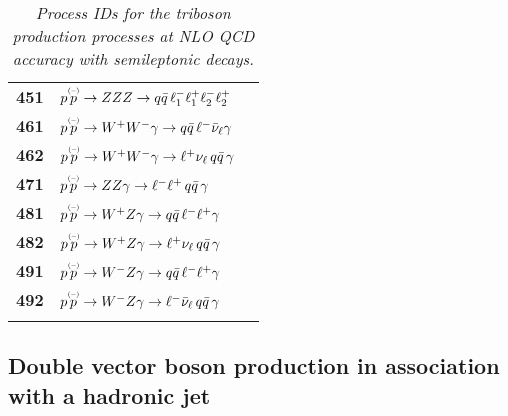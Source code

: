 \documentclass[english,12pt]{article}
\begin{document}
\begin{table}[t!]
\begin{center}
\begin{tabular}{c|l|l}
\bf 451 & $p \overset{\mbox{\tiny{(--)}}}{p} \to ZZZ \to  q \bar{q} \, \ell_{1}^{-} \ell_{1}^{+} \ell_{2}^{-}
\ell_{2}^{+}  $ & \\
\bf 461 & $p \overset{\mbox{\tiny{(--)}}}{p} \to W^{+}W^{-} \gamma \to  q \bar{q} \,
\ell^{-}\bar{\nu}_{\ell} \gamma$ & \\
\bf 462 & $p \overset{\mbox{\tiny{(--)}}}{p} \to W^{+}W^{-} \gamma \to \ell^{+} \nu_{\ell}
\, q \bar{q} \, \gamma$ & \\
\bf 471 & $p \overset{\mbox{\tiny{(--)}}}{p} \to Z Z \gamma \to \ell^{-} \ell^{+} \, q \bar{q} \, \gamma$ & \\
\bf 481 & $p \overset{\mbox{\tiny{(--)}}}{p} \to W^{+} Z \gamma \to  q \bar{q} \, \ell^{-}
\ell^{+} \gamma$ & \\
\bf 482 & $p \overset{\mbox{\tiny{(--)}}}{p} \to W^{+} Z \gamma \to \ell^{+}\nu_{\ell} \, q \bar{q} \, \gamma$ & \\
\bf 491 & $p \overset{\mbox{\tiny{(--)}}}{p} \to W^{-} Z \gamma \to  q \bar{q} \, \ell^{-}
\ell^{+} \gamma$ & \\
\bf 492 & $p \overset{\mbox{\tiny{(--)}}}{p} \to W^{-} Z \gamma \to \ell^{-} \bar{\nu}_{\ell} \, q \bar{q} \, \gamma$ & \\
&\\
\hline
\end{tabular}
\caption {\em  Process IDs for the triboson production processes at NLO QCD accuracy with semileptonic decays.}
\vspace{0.2cm}
\label{tab:prc5a}
\end{center}
\end{table}


\subsection{Double vector boson production in association with a hadronic jet}
\end{document}
